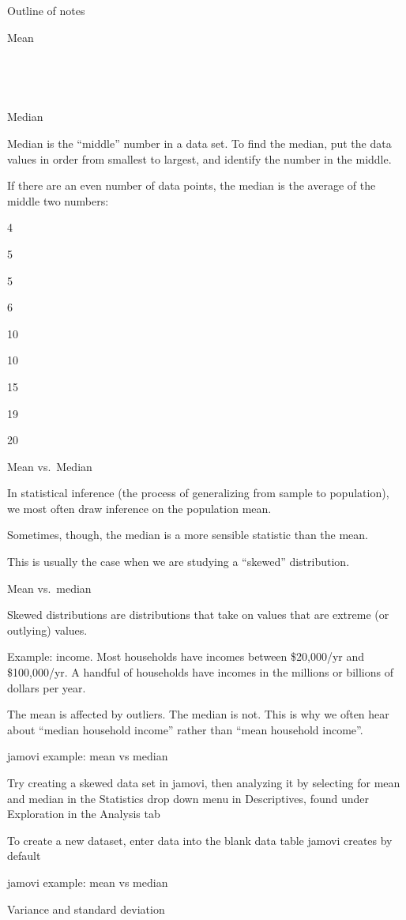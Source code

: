\documentclass[
  letterpaper,
  DIV=11,
  numbers=noendperiod]{scrreprt}
\begin{document}
Outline of notes

Mean

~

~

Median

Median is the ``middle'' number in a data set. To find the median, put
the data values in order from smallest to largest, and identify the
number in the middle.

If there are an even number of data points, the median is the average of
the middle two numbers:

4

5

5

6

10

10

15

19

20

Mean vs.~Median

In statistical inference (the process of generalizing from sample to
population), we most often draw inference on the population mean.

Sometimes, though, the median is a more sensible statistic than the
mean.

This is usually the case when we are studying a ``skewed'' distribution.

Mean vs.~median

Skewed distributions are distributions that take on values that are
extreme (or outlying) values.

Example: income. Most households have incomes between \$20,000/yr and
\$100,000/yr. A handful of households have incomes in the millions or
billions of dollars per year.

The mean is affected by outliers. The median is not. This is why we
often hear about ``median household income'' rather than ``mean
household income''.

jamovi example: mean vs median

Try creating a skewed data set in jamovi, then analyzing it by selecting
for mean and median in the Statistics drop down menu in Descriptives,
found under Exploration in the Analysis tab

To create a new dataset, enter data into the blank data table jamovi
creates by default

jamovi example: mean vs median

Variance and standard deviation
\end{document}
